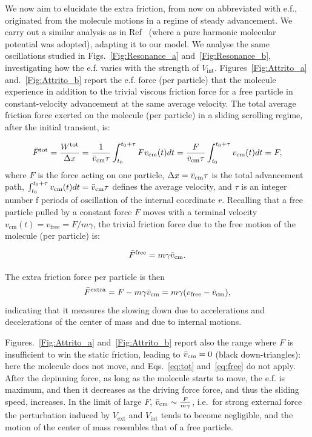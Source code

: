 We now aim to elucidate the extra friction, from now on abbreviated with e.f., originated from the molecule motions in a regime of steady advancement. We carry out a similar analysis as in Ref~\cite{Fusco} (where a pure harmonic molecular potential was adopted), adapting it to our model. We analyse the same oscillations studied in Figs.~\ref{Fig:Resonance_a} and~\ref{Fig:Resonance_b}, investigating how the e.f. varies with the strength of $V_\text{int}$. Figures~\ref{Fig:Attrito_a} and.~\ref{Fig:Attrito_b} report the e.f. force (per particle) that the molecule experience in addition to the trivial viscous friction force for a free particle in constant-velocity advancement at the same average velocity. The total average friction force exerted on the molecule (per particle) in a sliding scrolling regime, after the initial transient, is:

\begin{equation}
   \Bar{F}^{\text{tot}} = \frac{W^{\text{tot}}}{\Delta x} = \frac{1}{\Bar{v}_\text{cm}\tau} \int_{t_0}^{t_0+\tau}  F v_\text{cm}(t) dt =  \frac{F}{\Bar{v}_\text{cm}\tau} \int_{t_0}^{t_0+\tau}  v_\text{cm}(t) dt = F,
   \label{eq:tot}
\end{equation}
where $F$ is the force acting on one particle, $\Delta x = \Bar{v}_\text{cm}\tau$ is the total advancement path, $\int_{t_0}^{t_0+\tau}  v_\text{cm}(t) dt = \Bar{v}_\text{cm}\tau$ defines the average velocity, and $\tau$ is an integer number f periods of oscillation of the internal coordinate $r$. Recalling that a free particle pulled by a constant force $F$ moves with a terminal velocity $v_\text{cm}(t) = v_\text{free} = F/m\gamma $, the trivial friction force due to the free motion of the molecule (per particle) is:

\begin{equation}
   \Bar{F}^{\text{free}} = m \gamma \Bar{v}_\text{cm}.
   \label{eq:free}
\end{equation}

The extra friction force per particle is then
\begin{equation}
   \Bar{F}^{\text{extra}} = F - m\gamma \Bar{v}_\text{cm} = m\gamma (v_\text{free}-\Bar{v}_\text{cm}),
   \label{eq:extra}
\end{equation}
indicating that it measures the slowing down due to accelerations and decelerations of the center of mass and due to internal motions.

Figures.~\ref{Fig:Attrito_a} and~\ref{Fig:Attrito_b} report also the range where $F$ is insufficient to win the static friction, leading to $\Bar{v}_\text{cm} = 0$ (black down-triangles): here the molecule does not move, and Eqs.~\eqref{eq:tot} and~\eqref{eq:free} do not apply. After the depinning force, as long as the molecule starts to move, the e.f. is maximum, and then it decreases as the driving force force, and thus the sliding speed, increases. In the limit of large $F$, $\Bar{v}_\text{cm} \sim{\frac{F}{m\gamma}} $, i.e.\ for strong external force the perturbation induced by $V_\text{ext}$ and $V_\text{int}$ tends to become negligible, and the motion of the center of mass resembles that of a free particle.

